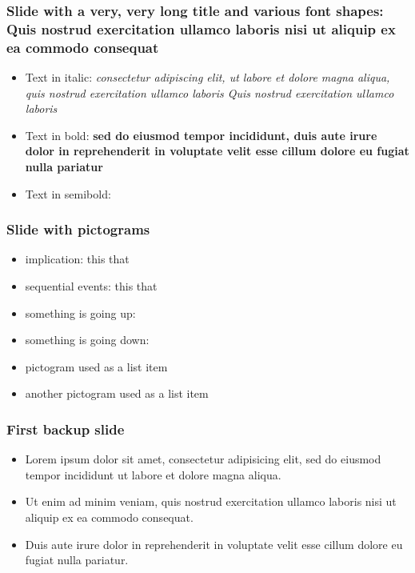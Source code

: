 \documentclass[11pt, aspectratio=169, xcolor={dvipsnames}, usepdftitle=false]{beamer}
\begin{document}
\begin{frame}
\frametitle{Slide with a very, very long title and various font shapes: Quis nostrud exercitation ullamco laboris nisi ut aliquip ex ea commodo consequat}
\begin{itemize}
\item Text in italic: \textit{consectetur adipiscing elit, ut labore et dolore magna aliqua, quis nostrud exercitation ullamco laboris Quis nostrud exercitation ullamco laboris}
\item Text in bold: \textbf{sed do eiusmod tempor incididunt, duis aute irure dolor in reprehenderit in voluptate velit esse cillum dolore eu fugiat nulla pariatur}
\item Text in semibold: 
\end{itemize}
\end{frame}

\begin{frame}
\frametitle{Slide with pictograms}
\begin{itemize}
\item implication: this \so that
\item sequential events: this \then that
\item something is going up: \up
\item something is going down: \down
\item[\so] pictogram used as a list item
\item[\then] another pictogram used as a list item
\end{itemize}
\end{frame}

\lastslide

\begin{frame}[label=backupSlide]
\frametitle{First backup slide}
\begin{itemize}
\item Lorem ipsum dolor sit amet, consectetur adipisicing elit, sed do eiusmod
tempor incididunt ut labore et dolore magna aliqua.
\item  Ut enim ad minim veniam, quis nostrud exercitation ullamco laboris nisi ut aliquip ex ea commodo consequat. 
\item Duis aute irure dolor in reprehenderit in voluptate velit esse
cillum dolore eu fugiat nulla pariatur. 
\end{itemize}
\hyperlink{firstSlide}{}
\end{frame}
\end{document}
